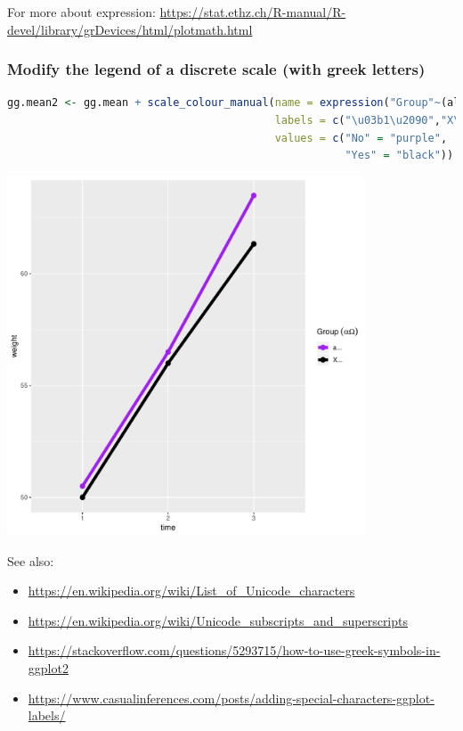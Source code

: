 \documentclass{article}
\begin{document}
For more about expression:
\url{https://stat.ethz.ch/R-manual/R-devel/library/grDevices/html/plotmath.html}
\subsubsection{Modify the legend of a discrete scale (with greek letters)}
\label{sec:org3611b71}

\begin{lstlisting}[language=r,numbers=none]
gg.mean2 <- gg.mean + scale_colour_manual(name = expression("Group"~(alpha*Omega)),
                                          labels = c("\u03b1\u2090","X\u1D30"),
                                          values = c("No" = "purple", 
                                                     "Yes" = "black"))
\end{lstlisting}

\begin{center}
\includegraphics[width=0.8\textwidth]{./figures/fig-meanTime2.pdf}
\end{center}

See also:
\begin{itemize}
\item \url{https://en.wikipedia.org/wiki/List\_of\_Unicode\_characters}
\item \url{https://en.wikipedia.org/wiki/Unicode\_subscripts\_and\_superscripts}
\item \url{https://stackoverflow.com/questions/5293715/how-to-use-greek-symbols-in-ggplot2}
\item \url{https://www.casualinferences.com/posts/adding-special-characters-ggplot-labels/}
\end{itemize}
\end{document}
